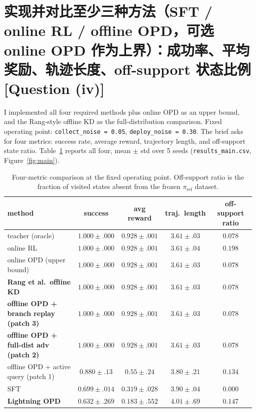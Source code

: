 \documentclass[11pt]{article}
\newcommand{\code}[1]{\texttt{#1}}
\newcommand{\qtag}[1]{\hfill{\normalfont\small\color{gray}[Question (#1)]}}
\begin{document}
\section{实现并对比至少三种方法（SFT / online RL / offline OPD，可选 online OPD 作为上界）：成功率、平均奖励、轨迹长度、off-support 状态比例 \qtag{iv}}
\label{sec:compare}

I implemented all four required methods plus online OPD as an upper bound, and the
Rang-style offline KD as the full-distribution comparison. Fixed operating point:
\code{collect\_noise = 0.05}, \code{deploy\_noise = 0.30}. The brief asks for four
metrics: success rate, average reward, trajectory length, and off-support state
ratio. Table~\ref{tab:metrics} reports all four, mean $\pm$ std over 5 seeds
(\code{results\_main.csv}, Figure~\ref{fig:main}).

\begin{table}[h]
\centering
\small
\begin{tabular}{l c c c c}
\toprule
\textbf{method} & \textbf{success} & \textbf{avg reward} & \textbf{traj.\ length} & \textbf{off-support ratio} \\
\midrule
teacher (oracle)               & $1.000 \pm .000$ & $0.928 \pm .001$ & $3.61 \pm .03$ & $0.078$ \\
online RL                      & $1.000 \pm .000$ & $0.928 \pm .001$ & $3.61 \pm .04$ & $0.198$ \\
online OPD (upper bound)       & $1.000 \pm .000$ & $0.928 \pm .001$ & $3.61 \pm .03$ & $0.078$ \\
\textbf{Rang et al.\ offline KD} & $\mathbf{1.000 \pm .000}$ & $0.928 \pm .001$ & $3.61 \pm .03$ & $0.078$ \\
\textbf{offline OPD + branch replay (patch 3)} & $\mathbf{1.000 \pm .000}$ & $0.928 \pm .001$ & $3.61 \pm .03$ & $0.078$ \\
\textbf{offline OPD + full-dist adv (patch 2)} & $\mathbf{1.000 \pm .000}$ & $0.928 \pm .001$ & $3.61 \pm .03$ & $0.078$ \\
offline OPD + active query (patch 1) & $0.880 \pm .13$ & $0.55 \pm .24$ & $3.80 \pm .21$ & $0.134$ \\
SFT                            & $0.699 \pm .014$ & $0.319 \pm .028$ & $3.90 \pm .04$ & $0.000$ \\
\textbf{Lightning OPD}         & $\mathbf{0.632 \pm .269}$ & $0.183 \pm .552$ & $4.01 \pm .69$ & $0.147$ \\
\bottomrule
\end{tabular}
\caption{Four-metric comparison at the fixed operating point. Off-support ratio is
the fraction of visited states absent from the frozen $\pi_{\mathrm{ref}}$ dataset.}
\label{tab:metrics}
\end{table}
\end{document}
